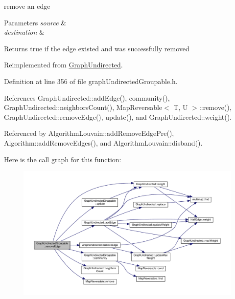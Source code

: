 remove an edge


\begin{DoxyParams}{Parameters}
{\em source} & \\
\hline
{\em destination} & \\
\hline
\end{DoxyParams}
\begin{DoxyReturn}{Returns}
true if the edge existed and was successfully removed 
\end{DoxyReturn}


Reimplemented from \hyperlink{classGraphUndirected_af4a40541132a66c9b688a20958057751}{Graph\+Undirected}.



Definition at line 356 of file graph\+Undirected\+Groupable.\+h.



References Graph\+Undirected\+::add\+Edge(), community(), Graph\+Undirected\+::neighbors\+Count(), Map\+Reversable$<$ T, U $>$\+::remove(), Graph\+Undirected\+::remove\+Edge(), update(), and Graph\+Undirected\+::weight().



Referenced by Algorithm\+Louvain\+::add\+Remove\+Edge\+Pre(), Algorithm\+::add\+Remove\+Edges(), and Algorithm\+Louvain\+::disband().

Here is the call graph for this function\+:
\nopagebreak
\begin{figure}[H]
\begin{center}
\leavevmode
\includegraphics[width=350pt]{classGraphUndirectedGroupable_ad1a488cc292d7e63d289f598aeaaacd6_cgraph}
\end{center}
\end{figure}
\mbox{\label{classGraphUndirectedGroupable_a88e02e4e05f304b289558922f1cb6aa1}} 
